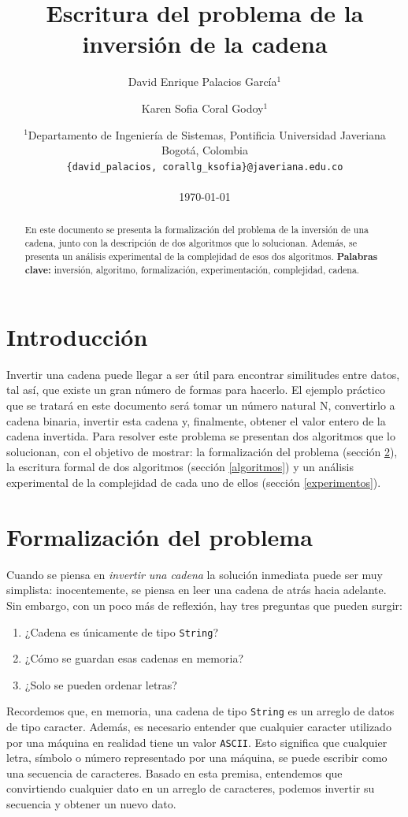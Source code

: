 \documentclass[letter]{article}
\title{Escritura del problema de la inversión de la cadena}
\author{David Enrique Palacios García$^1$ \and Karen Sofia Coral Godoy$^1$}
\date{
	$^1$Departamento de Ingeniería de Sistemas, Pontificia Universidad Javeriana\\Bogotá,  Colombia \\
	\texttt{\{david\_palacios, corallg\_ksofia\}@javeriana.edu.co}\\~\\
	\today
}
\begin{document}
\maketitle
	
\begin{abstract}
En este documento se presenta la formalización del problema de la inversión de una cadena, junto con la descripción de dos algoritmos que lo solucionan. Además, se presenta un análisis experimental de la complejidad de esos dos algoritmos.
\textbf{Palabras clave:} inversión, algoritmo, formalización, experimentación, complejidad, cadena.
\end{abstract}

\tableofcontents
	
\section{Introducción} \label{intro}
Invertir una cadena puede llegar a ser útil para encontrar similitudes entre datos, tal así, que existe un gran número de formas para hacerlo. El ejemplo práctico que se tratará en este documento será tomar un número natural N, convertirlo a cadena binaria, invertir esta cadena y, finalmente, obtener el valor entero de la cadena invertida. Para resolver este problema se presentan dos algoritmos que lo solucionan, con el objetivo de mostrar: la formalización del problema (sección \ref{formalizacion}), la escritura formal de dos algoritmos (sección \ref{algoritmos}) y un análisis experimental de la complejidad de cada uno de ellos (sección \ref{experimentos}).

\section{Formalización del problema} \label{formalizacion}
Cuando se piensa en {\it invertir una cadena} la solución inmediata puede ser muy simplista: inocentemente, se piensa en leer una cadena de atrás hacia adelante. Sin embargo, con un poco más de reflexión, hay tres preguntas que pueden surgir:
\begin{enumerate}
  \item ¿Cadena es únicamente de tipo \texttt{String}?
  \item ¿Cómo se guardan esas cadenas en memoria?
  \item ¿Solo se pueden ordenar letras?
\end{enumerate}

Recordemos que, en memoria, una cadena de tipo \texttt{String} es un arreglo de datos de tipo caracter. Además, es necesario entender que cualquier caracter utilizado por una máquina en realidad tiene un valor \texttt{ASCII}. Esto significa que cualquier letra, símbolo o número representado por una máquina, se puede escribir como una secuencia de caracteres.
Basado en esta premisa, entendemos que convirtiendo cualquier dato en un arreglo de caracteres, podemos invertir su secuencia y obtener un nuevo dato.
\end{document}
